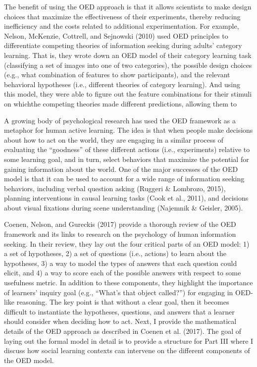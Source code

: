 \documentclass[english,man]{apa6}
\theoremstyle{definition}
\theoremstyle{definition}
\theoremstyle{definition}
\theoremstyle{remark}
\begin{document}
The benefit of using the OED approach is that it allows scientists to
make design choices that maximize the effectiveness of their
experiments, thereby reducing inefficiency and the costs related to
additional experimentation. For example, Nelson, McKenzie, Cottrell, and
Sejnowski (2010) used OED principles to differentiate competing theories
of information seeking during adults' category learning. That is, they
wrote down an OED model of their category learning task (classifying a
set of images into one of two categories), the possible design choices
(e.g., what combination of features to show participants), and the
relevant behavioral hypotheses (i.e., different theories of category
learning). And using this model, they were able to figure out the
feature combinations for their stimuli on whichthe competing theories
made different predictions, allowing them to

A growing body of psychological research has used the OED framework as a
metaphor for human active learning. The idea is that when people make
decisions about how to act on the world, they are engaging in a similar
process of evaluating the \enquote{goodness} of these different actions
(i.e., experiments) relative to some learning goal, and in turn, select
behaviors that maximize the potential for gaining information about the
world. One of the major successes of the OED model is that it can be
used to account for a wide range of information seeking behaviors,
including verbal question asking (Ruggeri \& Lombrozo, 2015), planning
interventions in causal learning tasks (Cook et al., 2011), and
decisions about visual fixations during scene understanding (Najemnik \&
Geisler, 2005).

Coenen, Nelson, and Gureckis (2017) provide a thorough review of the OED
framework and its links to research on the psychology of human
information seeking. In their review, they lay out the four critical
parts of an OED model: 1) a set of hypotheses, 2) a set of questions
(i.e., actions) to learn about the hypotheses, 3) a way to model the
types of answers that each question could elicit, and 4) a way to score
each of the possible answers with respect to some usefulness metric. In
addition to these components, they highlight the importance of learners'
inquiry goal (e.g., \enquote{What's that object called?}) for engaging
in OED-like reasoning. The key point is that without a clear goal, then
it becomes difficult to instantiate the hypotheses, questions, and
answers that a learner should consider when deciding how to act. Next, I
provide the mathematical details of the OED approach as described in
Coenen et al. (2017). The goal of laying out the formal model in detail
is to provide a structure for Part III where I discuss how social
learning contexts can intervene on the different components of the OED
model.
\end{document}
